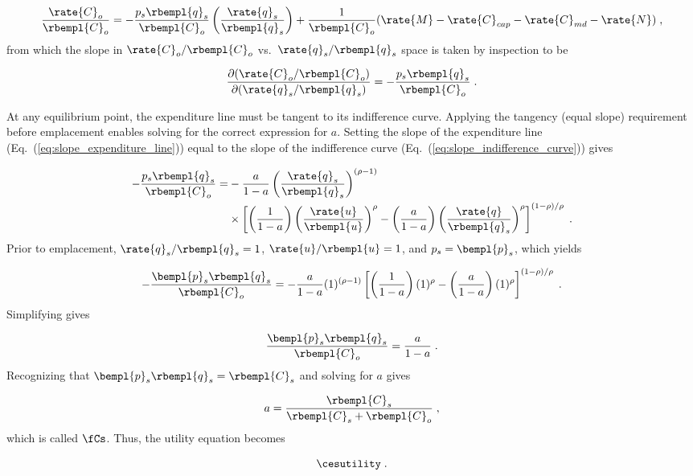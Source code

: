 \begin{equation}
  \frac{\rate{C}_o}{\rbempl{C}_o} = - \frac{p_s \rbempl{q}_s}{\rbempl{C}_o}  
                                        \left( \frac{\rate{q}_s}{\rbempl{q}_s}   \right)
                                    + \frac{1}{\rbempl{C}_o}
                                          (\rate{M} - \rate{C}_{cap} - \rate{C}_{md} - \rate{N}) \; ,
\end{equation}
%
from which the slope in $\rate{C}_o/\rbempl{C}_o$ vs.\ $\rate{q}_s/\rbempl{q}_s$ space
is taken by inspection to be

\begin{equation} \label{eq:slope_expenditure_line}
  \frac{\partial (\rate{C}_o/\rbempl{C}_o)}{\partial (\rate{q}_s/\rbempl{q}_s)} =
              - \frac{p_s \rbempl{q}_s}{\rbempl{C}_o} \; .
\end{equation}

At any equilibrium point, the expenditure line must be tangent to its indifference curve.
Applying the tangency (equal slope) requirement before emplacement enables 
solving for the correct expression for $a$.
Setting the slope of the expenditure line (Eq.~(\ref{eq:slope_expenditure_line}))
equal to the slope of the indifference curve (Eq.~(\ref{eq:slope_indifference_curve})) gives

\begin{align}
  - \frac{p_s \rbempl{q}_s}{\rbempl{C}_o} =& 
        -\frac{a}{1 - a} \left( \frac{\rate{q}_s}{\rbempl{q}_s} \right)^{(\rho -1)} \nonumber \\
        &\times \left[ \left( \frac{1}{1 - a} \right) \left( \frac{\rate{u}}{\rbempl{u}} \right)^\rho
                - \left( \frac{a}{1 - a} \right) 
                          \left( \frac{\rate{q}}{\rbempl{q}_s} \right)^\rho \right]^{(1 - \rho)/\rho} \; .
\end{align}
%
Prior to emplacement, $\rate{q}_s/\rbempl{q}_s = 1$, $\rate{u}/\rbempl{u} = 1$, and
$p_s = \bempl{p}_s$, which yields

\begin{equation}
  - \frac{\bempl{p}_s \rbempl{q}_s}{\rbempl{C}_o} =
        -\frac{a}{1 - a} (1)^{(\rho -1)}
        \left[ \left( \frac{1}{1 - a} \right) (1)^\rho
                - \left( \frac{a}{1 - a} \right) 
                          (1)^\rho \right]^{(1 - \rho)/\rho} \; .
\end{equation}
%
Simplifying gives

\begin{equation}
  \frac{\bempl{p}_s \rbempl{q}_s}{\rbempl{C}_o} = \frac{a}{1 - a} \; .
\end{equation}
%
Recognizing that $\bempl{p}_s \rbempl{q}_s = \rbempl{C}_s$ and solving for
$a$ gives

\begin{equation}
  a = \frac{\rbempl{C}_s}{\rbempl{C}_s + \rbempl{C}_o} \; ,
\end{equation}
%
which is called $\fCs$.
Thus, the utility equation becomes

\begin{equation} \label{eq:ces_utility}
  \cesutility \; .
\end{equation}
%


